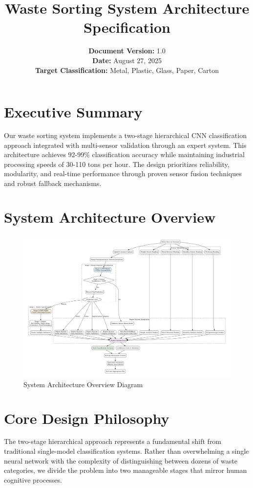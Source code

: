 \documentclass[11pt, a4paper]{article}
\title{Waste Sorting System Architecture Specification}
\author{
    \textbf{Document Version:} 1.0 \\
    \textbf{Date:} August 27, 2025 \\
    \textbf{Target Classification:} Metal, Plastic, Glass, Paper, Carton
}
\date{} %
\begin{document}
\maketitle
\tableofcontents
\newpage

\section{Executive Summary}

Our waste sorting system implements a two-stage hierarchical CNN classification approach integrated with multi-sensor validation through an expert system. This architecture achieves 92-99\% classification accuracy while maintaining industrial processing speeds of 30-110 tons per hour. The design prioritizes reliability, modularity, and real-time performance through proven sensor fusion techniques and robust fallback mechanisms.

\section{System Architecture Overview}

\begin{figure}[h!]
\centering
\includegraphics[width=\textwidth]{architecture.pdf}
\caption{System Architecture Overview Diagram}
\label{fig:system_architecture}
\end{figure}

\section{Core Design Philosophy}

The two-stage hierarchical approach represents a fundamental shift from traditional single-model classification systems. Rather than overwhelming a single neural network with the complexity of distinguishing between dozens of waste categories, we divide the problem into two manageable stages that mirror human cognitive processes.
\end{document}

